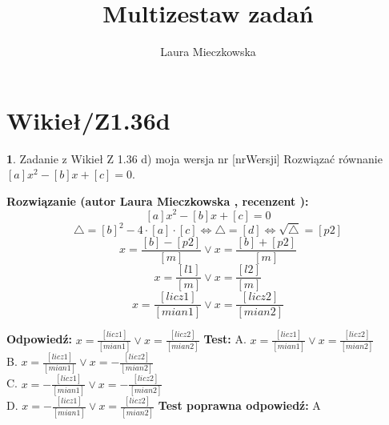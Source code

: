 \documentclass[12pt, a4paper]{article}
\title{Multizestaw zadań}
\author{Laura Mieczkowska}
\date{}
\theoremstyle{definition} %
\newtheorem{zad}{}
\newcommand{\kategoria}[1]{\section{#1}} %
\newcommand{\zadStart}[1]{\begin{zad}#1\newline} %
\newcommand{\zadStop}{\end{zad}}   %
\newcommand{\rozwStart}[2]{\noindent \textbf{Rozwiązanie (autor #1 , recenzent #2): }\newline} %
\newcommand{\odpStart}{\noindent \textbf{Odpowiedź:}\newline}    %
\newcommand{\odpStop}{\newline}                                             %
\newcommand{\testStart}{\noindent \textbf{Test:}\newline} %
\newcommand{\testStop}{\newline} %
\newcommand{\kluczStart}{\noindent \textbf{Test poprawna odpowiedź:}\newline} %
\newcommand{\kluczStop}{\newline} %
\begin{document}
\maketitle


\kategoria{Wikieł/Z1.36d}
\zadStart{Zadanie z Wikieł Z 1.36 d) moja wersja nr [nrWersji]}
Rozwiązać równanie $[a]x^2-[b]x+[c]=0$.
\zadStop
\rozwStart{Laura Mieczkowska}{}
$$[a]x^2-[b]x+[c]=0 $$ 
$$\triangle=[b]^2-4\cdot[a]\cdot[c] \Leftrightarrow \triangle=[d] \Leftrightarrow \sqrt{\triangle}=[p2]$$
$$x=\frac{[b]-[p2]}{[m]} \vee x=\frac{[b]+[p2]}{[m]}$$
$$x=\frac{[l1]}{[m]} \vee x=\frac{[l2]}{[m]}$$
$$x=\frac{[licz1]}{[mian1]} \vee x=\frac{[licz2]}{[mian2]}$$



\odpStart
$x=\frac{[licz1]}{[mian1]} \vee x=\frac{[licz2]}{[mian2]}$
\odpStop
\testStart
A. $x=\frac{[licz1]}{[mian1]} \vee x=\frac{[licz2]}{[mian2]}$ \\
B. $x=\frac{[licz1]}{[mian1]} \vee x=-\frac{[licz2]}{[mian2]}$ \\
C. $x=-\frac{[licz1]}{[mian1]} \vee x=-\frac{[licz2]}{[mian2]}$ \\
D. $x=-\frac{[licz1]}{[mian1]} \vee x=\frac{[licz2]}{[mian2]}$ 
\testStop
\kluczStart
A
\kluczStop
\end{document}
